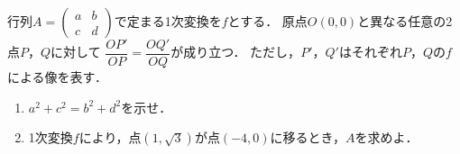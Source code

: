 \documentclass[../../main.tex]{subfiles}
\begin{document}
行列$A=
\begin{pmatrix} a & b \\ c & d
\end{pmatrix}$で定まる1次変換を$f$とする．
原点$O(0,0)$と異なる任意の2点$P$，$Q$に対して
$\displaystyle\dfrac{OP'}{OP}=\displaystyle\dfrac{OQ'}{OQ}$が成り立つ．
ただし，$P'$，$Q'$はそれぞれ$P$，$Q$の$f$による像を表す．
\begin{enumerate}
  \item $a^2+c^2=b^2+d^2$を示せ．
  \item 1次変換$f$により，点$(1,\sqrt{3})$が点$(-4,0)$に移るとき，$A$を求めよ．
\end{enumerate}
\end{document}
